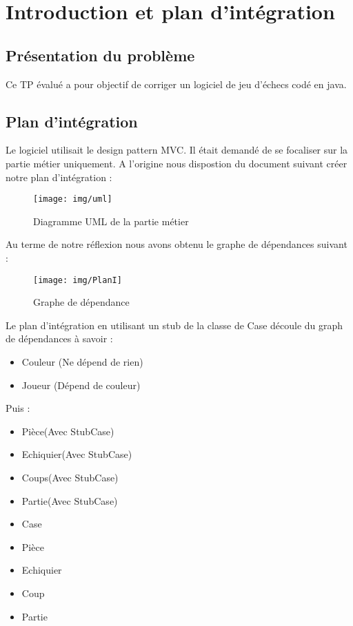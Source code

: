 \chapter{Introduction et plan d'intégration}
\section{Présentation du problème} 
Ce TP évalué a pour objectif de corriger un logiciel de jeu d'échecs codé en java.  

\section{Plan d'intégration}
Le logiciel utilisait le design pattern MVC. Il était demandé de se focaliser sur la partie métier uniquement. A l'origine nous dispostion du document suivant créer notre plan d'intégration : 
   \begin{figure}[htbp]
  \centering
  \texttt{[image: img/uml]}
  \caption{Diagramme UML de la partie métier}
  \label{fig:uml}
\end{figure}
\clearpage

Au terme de notre réflexion nous avons obtenu le graphe de dépendances  suivant : 
   \begin{figure}[htbp]
  \centering
  \texttt{[image: img/PlanI]}
  \caption{Graphe de dépendance}
  \label{fig:GDT}
\end{figure}

Le plan d'intégration en utilisant un stub de la classe de Case découle du graph de dépendances à savoir : 
\begin{itemize}
\item
Couleur (Ne dépend de rien)
\item
Joueur (Dépend de couleur)
\end{itemize}

Puis : 

\begin{itemize}
\item
Pièce(Avec StubCase)
\item
Echiquier(Avec StubCase)
\item
Coups(Avec StubCase)
\item
Partie(Avec StubCase)
\item
Case
\item
Pièce
\item
Echiquier
\item
Coup
\item
Partie
\end{itemize}

